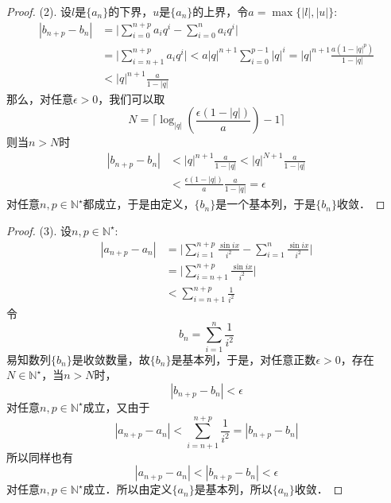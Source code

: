 \begin{proof}
(2). 设$l$是$\{a_n\}$的下界，$u$是$\{a_n\}$的上界，令$a = \max\{ |l|, |u| \}$:
\begin{align}
    |b_{n+p} - b_n| &= \Bigg\lvert \sum_{i=0}^{n+p} a_i q^i - \sum_{i=0}^{n} a_i q^i \Bigg\rvert \\
    &= \Bigg\lvert \sum_{i=n+1}^{n+p} a_i q^i \Bigg\rvert < a |q|^{n+1} \sum_{i=0}^{p-1} |q|^i = |q|^{n+1} \frac{a(1-|q|^p)}{1-|q|} \\
    &< |q|^{n+1} \frac{a}{1-|q|}
\end{align}
那么，对任意$\epsilon > 0$，我们可以取
\begin{equation}
    N = \lceil \log_{|q|} \left(\frac{\epsilon(1-|q|)}{a}\right) - 1\rceil
\end{equation}
则当$n > N$时
\begin{align}
    |b_{n+p}-b_n| &< |q|^{n+1}\frac{a}{1-|q|} < |q|^{N+1} \frac{a}{1-|q|} \\
    &< \frac{\epsilon(1-|q|)}{a} \frac{a}{1-|q|} = \epsilon
\end{align}
对任意$n, p\in\mathbb{N}^\star$都成立，于是由定义，$\{b_n\}$是一个基本列，于是$\{b_n\}$收敛．
\end{proof}
\begin{proof}
(3). 设$n,p\in\mathbb{N}^\star$:
\begin{align}
    |a_{n+p}-a_n| &= \Bigg\lvert \sum_{i=1}^{n+p} \frac{\sin ix}{i^2} - \sum_{i=1}^n \frac{\sin ix}{i^2} \Bigg\rvert \\
    &= \Bigg\lvert \sum_{i=n+1}^{n+p} \frac{\sin ix}{i^2} \Bigg\rvert \\
    &< \sum_{i=n+1}^{n+p} \frac{1}{i^2}
\end{align}
令
\begin{equation}
    b_n = \sum_{i=1}^n \frac{1}{i^2}
\end{equation}
易知数列$\{b_n\}$是收敛数量，故$\{b_n\}$是基本列，于是，对任意正数$\epsilon > 0$，存在$N \in \mathbb{N}^\star$，当$n>N$时，
\begin{equation}
    |b_{n+p}-b_{n}|<\epsilon
\end{equation}
对任意$n,p\in\mathbb{N}^\star$成立，又由于
\begin{equation}
    |a_{n+p}-a_n|<\sum_{i=n+1}^{n+p} \frac{1}{i^2}= |b_{n+p}-b_n|
\end{equation}
所以同样也有
\begin{equation}
    |a_{n+p}-a_n|<|b_{n+p}-b_n|<\epsilon
\end{equation}
对任意$n,p\in\mathbb{N}^\star$成立．所以由定义$\{a_n\}$是基本列，所以$\{a_n\}$收敛．
\end{proof}
